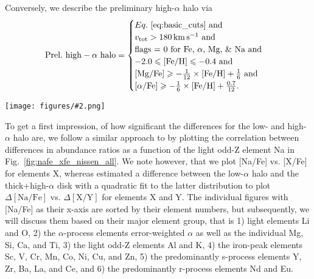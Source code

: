 \documentclass[fleqn,usenatbib]{mnras}
\newcommand{\codeicon}{{\faCloudDownload}}
\newcommand{\codelink}[1]{\href{https://github.com/svenbuder/buder_galah_accreted_chemistry/tree/main/figures/#1.ipynb}{\codeicon}\,\,}
\newcommand{\oscaption}[2]{\caption{#2 \codelink{#1}}}
\newcommand{\figuretextwidth}[4]{\begin{figure*} \centering \texttt{[image: figures/\#2.png]}\oscaption{#3}{#4}\label{fig:#2} \end{figure*}}
\begin{document}
Conversely, we describe the preliminary high-$\alpha$ halo via
\begin{equation} \label{eq:prelim_high_alpha_halo}
\mathrm{Prel.~high-\alpha~halo} =
\begin{cases}
Eq.~\ref{eq:basic_cuts} \text{ and} \\
v_\text{tot} > 180\,\mathrm{km\,s^{-1}} \text{ and} \\
\text{flags = 0 for Fe, }\alpha\text{, Mg, \& Na and} \\
-2.0 \leq \mathrm{[Fe/H]} \leq -0.4 \text{ and}\\
\mathrm{[Mg/Fe]} \geq - \frac{1}{12} \times \mathrm{[Fe/H]} + \frac{1}{6} \text{ and}\\
\mathrm{[\alpha/Fe]} \geq - \frac{1}{6} \times \mathrm{[Fe/H]} + \frac{0.7}{12}.\\
\end{cases}
\end{equation}

\figuretextwidth{17cm}{nafe_xfe_nissen_all}{chemical_differences}{
\textbf{Abundances [X/Fe] for the the 28 elements measured by GALAH in addition to Na and Fe, whose abundance ratio [Na/Fe] is used on the ordinate.} The density distribution of the base sample of GALAH+ DR3 (Eq.~\ref{eq:basic_cuts}) is shown in greyscale. GALAH+ DR3 stars which are preliminary tagged to the low-$\alpha$ halo (via Eq.~\ref{eq:prelim_low_alpha_halo}) are shown in orange.
We also show the data by \citet{Nissen2010} for $\alpha$, Na, Mg, Si, Ca, Ti, Cr, and Ni with red circles for their low-$\alpha$ halo stars, blue open circles for their high-$\alpha$ halo stars and black crossed for their thick disk stars. For the same stars of this study, we plot the data by \citet{Nissen2011} for Mn, Cu, Zn, Y, and Ba, \citet{Nissen2012} for Li (their non-LTE values), \citet{Nissen2014} for O (their non-LTE values based on the $\lambda 7774$ \ion{O}{i} triplet), and \citet{Fishlock2017} for Sc, Zr, La, Ce, Nd, and Eu. Arrows show upper limits coloured by their respective selection.
}

To get a first impression, of how significant the differences for the low- and high-$\alpha$ halo are, we follow a similar approach to \citet[][see their Fig.~5]{Nissen2011} by plotting the correlation between differences in abundance ratios as a function of the light odd-Z element Na in Fig.~\ref{fig:nafe_xfe_nissen_all}. We note however, that we plot [Na/Fe] vs. [X/Fe] for elements X, whereas \citet{Nissen2011} estimated a difference between the low-$\alpha$ halo and the thick+high-$\alpha$ disk with a quadratic fit to the latter distribution to plot $\Delta \mathrm{[Na/Fe]}$ vs. $\Delta \mathrm{[X/Y]}$ for elements X and Y. The individual figures with [Na/Fe] as their x-axis are sorted by their element numbers, but subsequently, we will discuss them based on their major element group, that is 1) light elements Li and O, 2) the $\alpha$-process elements error-weighted $\alpha$ as well as the individual Mg, Si, Ca, and Ti, 3) the light odd-Z elements Al and K, 4) the iron-peak elements Sc, V, Cr, Mn, Co, Ni, Cu, and Zn, 5) the predominantly s-process elements Y, Zr, Ba, La, and Ce, and 6) the predominantly r-process elements Nd and Eu.
\end{document}
